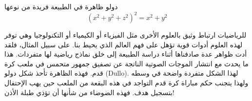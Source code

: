 \begin{surferPage}[دولو]{دولو }
ظاهرة في الطبيعة فريدة من نوعها\\
\smallskip
\[(x^2+ y^2+ z^2)^2	= x^2+ y^2\]

\singlespacing
للرياضيات ارتباط وثيق بالعلوم الأخرى مثل الفيزياء أو الكيمياء أو التكنولوجيا وهي توفر لهذه العلوم أدوات قوية تؤهل على فهم العالم الذي يحيط بنا.
\singlespacing
على سبيل المثال، فلقد أدت ظواهر عدة صادفناها أثناء دراسة الطبيعة إلى خلق نماذج رياضية لها متفردات.
\singlespacing
هذا ما يحدث مع انتشار الموجات الصوتية الناتجة عن تصفيق جمهور متحمس في ملعب كرة قدم. فهذه الظاهرة تأحذ شكل دولو \textenglish{(Dullo)}. لهذا الشكل متفردة واضحة في وسطه ولهذا يتجنب حكم مباراة كرة قدم التواجد في هذه البقعة من الملعب حين يهب الإحتفال بتسجيل هدف. فهذه الضوضاء من شأنها أن تؤذي طبلة الأذن!
\end{surferPage}

